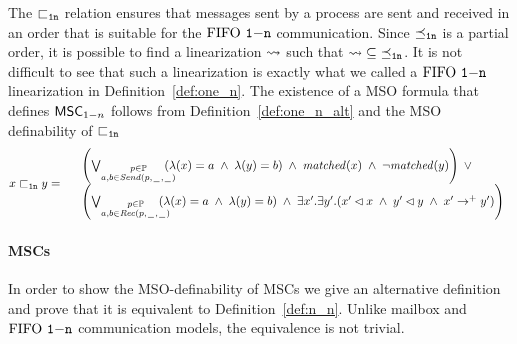 The ${\sqsubset_{\mathtt{1n}}}$ relation ensures that messages sent by a process are sent and received in an order that is suitable for the $\text{FIFO } \mathtt{1\mathsf{-}n}$ communication. Since ${\preceq_{\mathtt{1n}}}$ is a partial order, it is possible to find a linearization $\rightsquigarrow$ such that $\rightsquigarrow \;\subseteq\; \preceq_{\mathtt{1n}}$. It is not difficult to see that such a linearization is exactly what we called a $\text{FIFO } \mathtt{1\mathsf{-}n}$ linearization in Definition~\ref{def:one_n}.
The existence of a MSO formula that defines $\mathsf{MSC}_{1\mathsf{-}n}$ follows from Definition~\ref{def:one_n_alt} and the MSO definability
of $\sqsubset_{\mathtt{1n}}$
\[
x \sqsubset_{\mathtt{1n}} y =
\begin{array}{rl}
& \left(
	\bigvee_{\substack{p \in \mathbb{P}\\a,b \in {\mathit{Send}(p,\hspace{0.1em}\underline{\hspace{0.5em}}\hspace{0.1em},\hspace{0.1em}\underline{\hspace{0.5em}}\hspace{0.1em})}}}\hspace{-1em}
	(\lambda(x) = a \;\wedge\; \lambda(y) = b)
	\;\wedge\; \mathit{matched}(x) \;\wedge\; \neg \mathit{matched}(y)
\right) \;\vee\\
& \left(
	\bigvee_{\substack{p \in \mathbb{P}\\a,b \in {\mathit{Rec}(p,\hspace{0.1em}\underline{\hspace{0.5em}}\hspace{0.1em},\hspace{0.1em}\underline{\hspace{0.5em}}\hspace{0.1em})}}}\hspace{-1em}
	(\lambda(x) = a \;\wedge\; \lambda(y) = b)
	\;\wedge\;
	\exists x'.\exists y'. (x' \lhd x \;\wedge\; y' \lhd y \;\wedge\; x' \to^+ y')
\right)\\
\end{array}
\]


\paragraph{\bf \nn MSCs}

In order to show the MSO-definability of \nn MSCs we give an alternative definition and prove that it is equivalent to Definition~\ref{def:n_n}. Unlike mailbox and $\text{FIFO } \mathtt{1\mathsf{-}n}$ communication models, the equivalence is not trivial.

